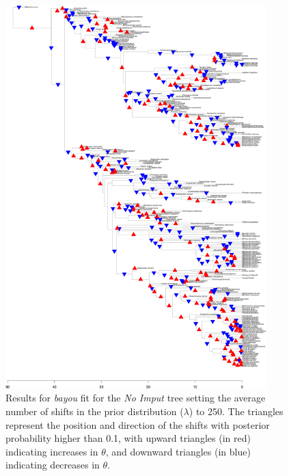 \begin{figure}[H]
\includegraphics[width=0.9\textwidth]{img/plots-noimput-wZBL-k250-1.pdf}
\caption{Results for \textit{bayou} fit for the \textit{No Imput} tree setting the average number of shifts in the prior distribution ($\lambda$) to 250. The triangles represent the position and direction of the shifts with posterior probability higher than 0.1, with upward triangles (in red) indicating increases in $\theta$, and downward triangles (in blue) indicating decreases in $\theta$.}
\label{fig:noimput-k250}
\end{figure}

\newpage

